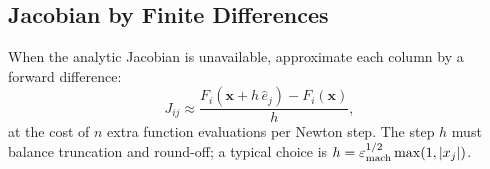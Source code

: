 
\subsection{Jacobian by Finite Differences}\label{subsec:lec10:fd_jacobian}

When the analytic Jacobian is unavailable, approximate each column
by a forward difference:
\begin{equation}
  J_{ij} \approx \frac{F_i(\mathbf{x}+h\,\hat{e}_j)-F_i(\mathbf{x})}{h},
  \label{eq:lec10:fdJ}
\end{equation}
at the cost of $n$ extra function evaluations per Newton step.
The step $h$ must balance truncation and round-off; a typical choice
is $h = \varepsilon_\text{mach}^{1/2}\max(1,|x_j|)$.
